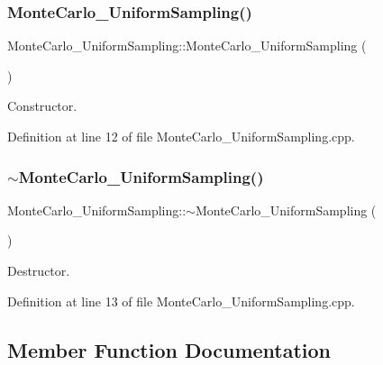 \subsubsection{\texorpdfstring{Monte\+Carlo\+\_\+\+Uniform\+Sampling()}{MonteCarlo\_UniformSampling()}}
{\footnotesize\ttfamily Monte\+Carlo\+\_\+\+Uniform\+Sampling\+::\+Monte\+Carlo\+\_\+\+Uniform\+Sampling (\begin{DoxyParamCaption}{ }\end{DoxyParamCaption})}



Constructor. 



Definition at line 12 of file Monte\+Carlo\+\_\+\+Uniform\+Sampling.\+cpp.

\mbox{\label{class_monte_carlo___uniform_sampling_a1ccdb02604ffeb1f334b55ec24584f0c}} 
\subsubsection{\texorpdfstring{$\sim$\+Monte\+Carlo\+\_\+\+Uniform\+Sampling()}{~MonteCarlo\_UniformSampling()}}
{\footnotesize\ttfamily Monte\+Carlo\+\_\+\+Uniform\+Sampling\+::$\sim$\+Monte\+Carlo\+\_\+\+Uniform\+Sampling (\begin{DoxyParamCaption}{ }\end{DoxyParamCaption})}



Destructor. 



Definition at line 13 of file Monte\+Carlo\+\_\+\+Uniform\+Sampling.\+cpp.



\subsection{Member Function Documentation}
\mbox{\label{class_monte_carlo___uniform_sampling_a1920387a9f817c8179531fa02f7c00d3}} 
